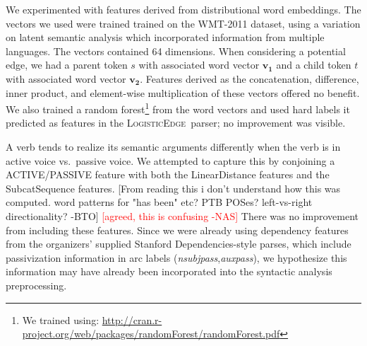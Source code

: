 \documentclass[11pt]{article}
\newcommand{\bocomment}[1]{\textcolor{Bittersweet}{[#1 -BTO]}}
\newcommand{\nas}[1]{\textcolor{red}{[#1 -NAS]}}
\newcommand{\logitedge}{\textsc{LogisticEdge}}
\begin{document}
We experimented with features derived from distributional word embeddings.
The vectors we used \cite{wordVectors} were trained trained on the WMT-2011
dataset, using a variation on latent semantic analysis which incorporated
information from multiple languages.
The vectors contained 64 dimensions.
When considering a potential edge, we
had a parent token $s$ with associated word vector $\bm{v_1}$ and a child token
$t$ with associated word vector $\bm{v_2}$.  Features
derived as the
concatenation, difference, inner product, and element-wise
multiplication of these vectors offered no benefit.  We also trained a
random forest\footnote{We trained using:  \url{http://cran.r-project.org/web/packages/randomForest/randomForest.pdf}}  from the word vectors and used hard labels it predicted
as features in the \logitedge\ parser; no improvement was visible.




A verb tends to realize its semantic arguments differently when the verb is in
active voice vs.~passive voice.
We attempted to capture this by conjoining a ACTIVE/PASSIVE feature with both
the LinearDistance features and the SubcatSequence features.
\bocomment{From reading this i don't understand how this was
  computed. word patterns for "has been" etc? PTB POSes? left-vs-right
  directionality?} \nas{agreed, this is confusing}
There was no improvement from including these features.
Since we were already using dependency features from the 
organizers' supplied Stanford Dependencies-style parses,
which include passivization information in arc labels (\emph{nsubjpass},\emph{auxpass}),
we hypothesize this information may have already been incorporated into the syntactic analysis preprocessing.
\end{document}
